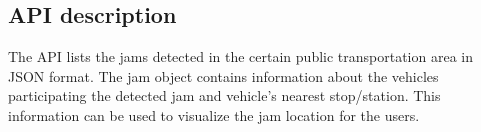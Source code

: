 \subsection*{API description}

The API lists the jams detected in the certain public transportation
area in JSON format. The jam object contains information about the
vehicles participating the detected jam and vehicle’s nearest
stop/station. This information can be used to visualize the jam
location for the users.






